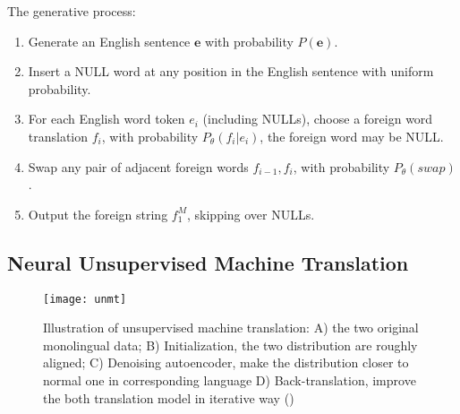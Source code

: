 The generative process:
\begin{enumerate}
	\item Generate an English sentence $\bm{e}$ with probability $P(\bm{e})$.
	\item Insert a NULL word at any position in the English sentence with uniform probability.
	\item For each English word token $e_i$ (including NULLs), choose a foreign word translation $f_i$, with probability $P_{\theta}(f_i| e_i)$, the foreign word may be NULL.
	\item Swap any pair of adjacent foreign words $f_{i-1}, f_i$, with probability ${P_{\theta}(swap)}$. 
	\item Output the foreign string $f_1^M$, skipping over NULLs.
\end{enumerate}


\subsection{Neural Unsupervised Machine Translation}

\begin{figure}[h]
	\texttt{[image: unmt]}
	\caption{Illustration of unsupervised machine translation: A) the two original monolingual data; B) Initialization, the two distribution are roughly aligned; C) Denoising autoencoder, make the distribution closer to normal one in corresponding language D) Back-translation, improve the both translation model in iterative way (\cite{lample2018phrase})}

\end{figure}





